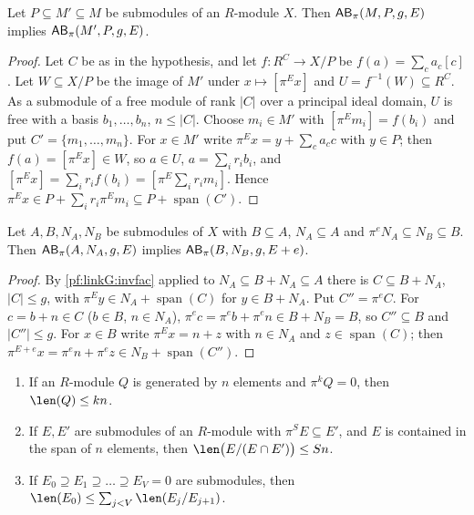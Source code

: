 \begin{lemma}\label{pf:linkG:invfac}
Let $P\subseteq M'\subseteq M$ be submodules of an $R$-module $X$. Then $\mathsf{AB}_\pi(M,P,g,E)$ implies
$\mathsf{AB}_\pi(M',P,g,E)$.
\end{lemma}

\begin{proof}
Let $C$ be as in the hypothesis, and let $f:R^C\to X/P$ be $f(a)=\sum_ca_c[c]$. Let $W\subseteq X/P$ be the image of
$M'$ under $x\mapsto[\pi^Ex]$ and $U=f^{-1}(W)\subseteq R^C$. As a submodule of a free module of rank $|C|$ over a
principal ideal domain, $U$ is free with a basis $b_1,\dots,b_n$, $n\le|C|$. Choose $m_i\in M'$ with
$[\pi^Em_i]=f(b_i)$ and put $C'=\{m_1,\dots,m_n\}$. For $x\in M'$ write $\pi^Ex=y+\sum_ca_cc$ with $y\in P$; then
$f(a)=[\pi^Ex]\in W$, so $a\in U$, $a=\sum_ir_ib_i$, and $[\pi^Ex]=\sum_ir_if(b_i)=[\pi^E\sum_ir_im_i]$. Hence
$\pi^Ex\in P+\sum_ir_i\pi^Em_i\subseteq P+\operatorname{span}(C')$.
\end{proof}

\begin{lemma}[Shift]\label{pf:linkG:invshift}
Let $A,B,N_A,N_B$ be submodules of $X$ with $B\subseteq A$, $N_A\subseteq A$ and $\pi^eN_A\subseteq N_B\subseteq B$. Then
$\mathsf{AB}_\pi(A,N_A,g,E)$ implies $\mathsf{AB}_\pi(B,N_B,g,E+e)$.
\end{lemma}

\begin{proof}
By \cref{pf:linkG:invfac} applied to $N_A\subseteq B+N_A\subseteq A$ there is $C\subseteq B+N_A$, $|C|\le g$, with
$\pi^Ey\in N_A+\operatorname{span}(C)$ for $y\in B+N_A$. Put $C''=\pi^eC$. For $c=b+n\in C$ ($b\in B$, $n\in N_A$),
$\pi^ec=\pi^eb+\pi^en\in B+N_B=B$, so $C''\subseteq B$ and $|C''|\le g$. For $x\in B$ write $\pi^Ex=n+z$ with $n\in
N_A$ and $z\in\operatorname{span}(C)$; then $\pi^{E+e}x=\pi^en+\pi^ez\in N_B+\operatorname{span}(C'')$.
\end{proof}

\begin{lemma}\label{pf:linkG:lenlemmas}
\begin{enumerate}[label=(\alph*)]
\item If an $R$-module $Q$ is generated by $n$ elements and $\pi^kQ=0$, then $\len(Q)\le kn$.
\item If $E,E'$ are submodules of an $R$-module with $\pi^SE\subseteq E'$, and $E$ is contained in the span of $n$
elements, then $\len\bigl(E/(E\cap E')\bigr)\le Sn$.
\item If $E_0\supseteq E_1\supseteq\dots\supseteq E_V=0$ are submodules, then
$\len(E_0)\le\sum_{j<V}\len(E_j/E_{j+1})$.
\end{enumerate}
\end{lemma}

